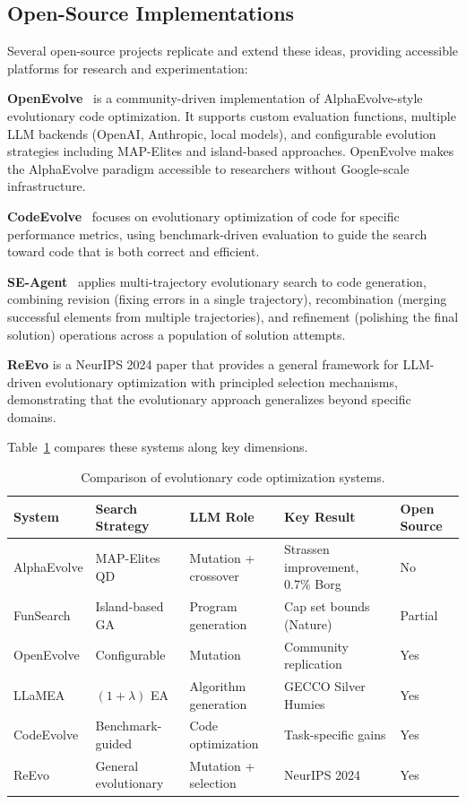 \documentclass[11pt,a4paper]{article}
\begin{document}
\subsection{Open-Source Implementations}

Several open-source projects replicate and extend these ideas, providing accessible platforms for research and experimentation:

\textbf{OpenEvolve}~\citep{openevolve2024} is a community-driven implementation of AlphaEvolve-style evolutionary code optimization. It supports custom evaluation functions, multiple LLM backends (OpenAI, Anthropic, local models), and configurable evolution strategies including MAP-Elites and island-based approaches. OpenEvolve makes the AlphaEvolve paradigm accessible to researchers without Google-scale infrastructure.

\textbf{CodeEvolve}~\citep{wang2024codeevolve} focuses on evolutionary optimization of code for specific performance metrics, using benchmark-driven evaluation to guide the search toward code that is both correct and efficient.

\textbf{SE-Agent}~\citep{rafaelov2024seagent} applies multi-trajectory evolutionary search to code generation, combining revision (fixing errors in a single trajectory), recombination (merging successful elements from multiple trajectories), and refinement (polishing the final solution) operations across a population of solution attempts.

\textbf{ReEvo} is a NeurIPS 2024 paper that provides a general framework for LLM-driven evolutionary optimization with principled selection mechanisms, demonstrating that the evolutionary approach generalizes beyond specific domains.

Table~\ref{tab:evolutionary-systems} compares these systems along key dimensions.

\begin{table}[t]
\centering
\caption{Comparison of evolutionary code optimization systems.}
\label{tab:evolutionary-systems}
\small
\begin{tabular}{@{}p{2cm}p{2.5cm}p{2cm}p{2.5cm}p{1.5cm}@{}}
\toprule
\textbf{System} & \textbf{Search Strategy} & \textbf{LLM Role} & \textbf{Key Result} & \textbf{Open Source} \\
\midrule
AlphaEvolve & MAP-Elites QD & Mutation + crossover & Strassen improvement, 0.7\% Borg & No \\
FunSearch & Island-based GA & Program generation & Cap set bounds (Nature) & Partial \\
OpenEvolve & Configurable & Mutation & Community replication & Yes \\
LLaMEA & $(1+\lambda)$ EA & Algorithm generation & GECCO Silver Humies & Yes \\
CodeEvolve & Benchmark-guided & Code optimization & Task-specific gains & Yes \\
ReEvo & General evolutionary & Mutation + selection & NeurIPS 2024 & Yes \\
\bottomrule
\end{tabular}
\end{table}
\end{document}
